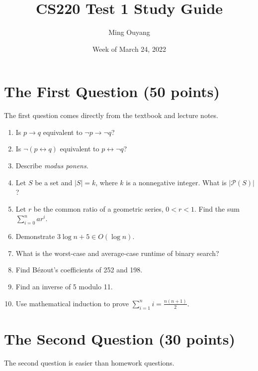 \documentclass[letterpaper, 12pt]{article}
\title{CS220 Test 1 Study Guide}
\author{Ming Ouyang}
\date{Week of March 24, 2022}
\begin{document}
\maketitle

\section{The First Question (50 points)}
The first question comes directly from the textbook and lecture notes.

\begin{enumerate}
    \item Is $p \to q$ equivalent to $\neg p \to \neg q$?
    \item Is $\neg (p \leftrightarrow q)$ equivalent to $p \leftrightarrow \neg q$?
    \item Describe \textit{modus ponens}.
    \item Let $S$ be a set and $|S| = k$, where $k$ is a nonnegative integer. What is $|\mathcal{P}(S)|$?
    \item Let $r$ be the common ratio of a geometric series, $0 < r < 1$. Find the sum $\sum_{i=0}^{n} ar^i$.
    \item Demonstrate $3 \log n + 5 \in O(\log n)$.
    \item What is the worst-case and average-case runtime of binary search?
    \item Find B\'{e}zout's coefficients of 252 and 198.
    \item Find an inverse of 5 modulo 11.
    \item Use mathematical induction to prove $\sum_{i=1}^{n} i = \frac{n(n + 1)}{2}$.
\end{enumerate}

\section{The Second Question (30 points)}
The second question is easier than homework questions.
\end{document}
